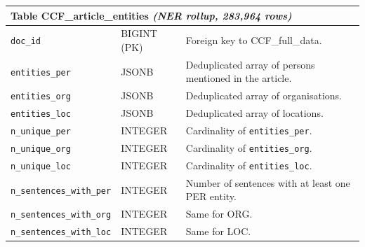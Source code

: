 \begin{longtable}{p{3.6cm}p{2.4cm}p{16.5cm}}
\multicolumn{3}{l}{\cellcolor{gray!12}\textbf{Table CCF\_article\_entities} \emph{(NER rollup, 283{,}964 rows)}} \\
\midrule
\texttt{doc\_id}                & BIGINT (PK)   & Foreign key to CCF\_full\_data. \\
\texttt{entities\_per}          & JSONB         & Deduplicated array of persons mentioned in the article. \\
\texttt{entities\_org}          & JSONB         & Deduplicated array of organisations. \\
\texttt{entities\_loc}          & JSONB         & Deduplicated array of locations. \\
\texttt{n\_unique\_per}         & INTEGER       & Cardinality of \texttt{entities\_per}. \\
\texttt{n\_unique\_org}         & INTEGER       & Cardinality of \texttt{entities\_org}. \\
\texttt{n\_unique\_loc}         & INTEGER       & Cardinality of \texttt{entities\_loc}. \\
\texttt{n\_sentences\_with\_per} & INTEGER      & Number of sentences with at least one PER entity. \\
\texttt{n\_sentences\_with\_org} & INTEGER      & Same for ORG. \\
\texttt{n\_sentences\_with\_loc} & INTEGER      & Same for LOC. \\
\midrule


\end{longtable}
